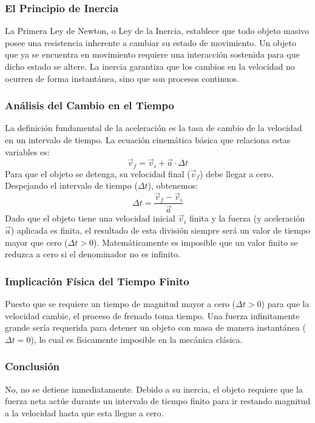 \documentclass[12pt]{article}
\begin{document}
\subsubsection*{El Principio de Inercia}
La Primera Ley de Newton, o Ley de la Inercia, establece que todo objeto masivo posee una resistencia inherente a cambiar su estado de movimiento. Un objeto que ya se encuentra en movimiento requiere una interacción sostenida para que dicho estado se altere. La inercia garantiza que los cambios en la velocidad no ocurren de forma instantánea, sino que son procesos continuos.

\subsubsection*{Análisis del Cambio en el Tiempo}
La definición fundamental de la aceleración es la tasa de cambio de la velocidad en un intervalo de tiempo. La ecuación cinemática básica que relaciona estas variables es:
\begin{equation}
    \vec{v}_f = \vec{v}_i + \vec{a} \cdot \Delta t
\end{equation}
Para que el objeto se detenga, su velocidad final ($\vec{v}_f$) debe llegar a cero. Despejando el intervalo de tiempo ($\Delta t$), obtenemos:
\begin{equation}
    \Delta t = \frac{\vec{v}_f - \vec{v}_i}{\vec{a}}
\end{equation}
Dado que el objeto tiene una velocidad inicial $\vec{v}_i$ finita y la fuerza (y aceleración $\vec{a}$) aplicada es finita, el resultado de esta división siempre será un valor de tiempo mayor que cero ($\Delta t > 0$). Matemáticamente es imposible que un valor finito se reduzca a cero si el denominador no es infinito. 

\subsubsection*{Implicación Física del Tiempo Finito}
Puesto que se requiere un tiempo de magnitud mayor a cero ($\Delta t > 0$) para que la velocidad cambie, el proceso de frenado toma tiempo. Una fuerza infinitamente grande sería requerida para detener un objeto con masa de manera instantánea ($\Delta t = 0$), lo cual es físicamente imposible en la mecánica clásica.

\subsubsection*{Conclusión}
No, no se detiene inmediatamente. Debido a su inercia, el objeto requiere que la fuerza neta actúe durante un intervalo de tiempo finito para ir restando magnitud a la velocidad hasta que esta llegue a cero.
\end{document}
